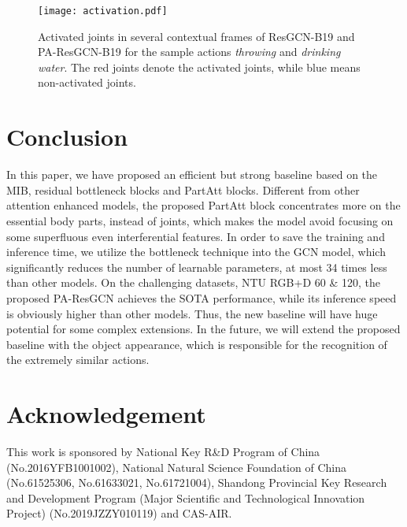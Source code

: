 \documentclass[sigconf]{acmart}
\begin{document}
\begin{figure}[t]
  \centerline{\texttt{[image: activation.pdf]}}
  \caption{Activated joints in several contextual frames of ResGCN-B19 and PA-ResGCN-B19 for the sample actions {\it throwing} and {\it drinking water}. The {\color{red}red} joints denote the activated joints, while {\color{blue}blue} means non-activated joints. \bv}\label{fig:activation}
  \vspace{-0.4cm}
\end{figure}

\section{Conclusion}
\label{sec:conclusion}

In this paper, we have proposed an efficient but strong baseline based on the MIB, residual bottleneck blocks and PartAtt blocks. Different from other attention enhanced models, the proposed PartAtt block concentrates more on the essential body parts, instead of joints, which makes the model avoid focusing on some superfluous even interferential features. In order to save the training and inference time, we utilize the bottleneck technique into the GCN model, which significantly reduces the number of learnable parameters, at most 34 times less than other models. On the challenging datasets, NTU RGB+D 60 \& 120, the proposed PA-ResGCN achieves the SOTA performance, while its inference speed is obviously higher than other models. Thus, the new baseline will have huge potential for some complex extensions. In the future, we will extend the proposed baseline with the object appearance, which is responsible for the recognition of the extremely similar actions.

\iffinal

\section*{Acknowledgement}
\label{sec:Acknowledgement}

This work is sponsored by National Key R\&D Program of China (No.2016YFB1001002), National Natural Science Foundation of China (No.61525306, No.61633021, No.61721004), Shandong Provincial Key Research and Development Program (Major Scientific and Technological Innovation Project) (No.2019JZZY010119) and CAS-AIR.

\fi


\balance

\end{document}
